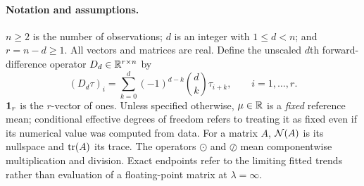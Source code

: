 \paragraph{Notation and assumptions.}
$n\ge2$ is the number of observations; $d$ is an integer with $1\le d<n$; and $r=n-d\ge1$. All vectors and matrices are real. Define the unscaled $d$th forward-difference operator $D_d\in\mathbb R^{r\times n}$ by
\begin{equation}\label{eq:defD}
(D_d\tau)_i=\sum_{k=0}^{d}(-1)^{d-k}\binom dk \tau_{i+k},
\qquad i=1,\ldots,r.
\end{equation}
$\mathbf 1_r$ is the $r$-vector of ones. Unless specified otherwise, $\mu\in\mathbb R$ is a \emph{fixed} reference mean; conditional effective degrees of freedom refers to treating it as fixed even if its numerical value was computed from data. For a matrix $A$, $\mathcal N(A)$ is its nullspace and $\operatorname{tr}(A)$ its trace. The operators $\odot$ and $\oslash$ mean componentwise multiplication and division. Exact endpoints refer to the limiting fitted trends rather than evaluation of a floating-point matrix at $\lambda=\infty$.
